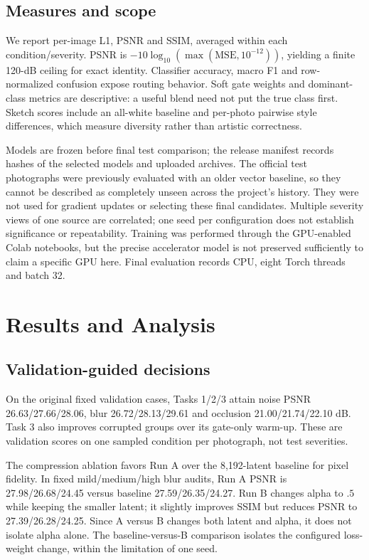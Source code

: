 \documentclass[conference]{IEEEtran}
\begin{document}
\subsection{Measures and scope}
We report per-image L1, PSNR and SSIM, averaged within each condition/severity. PSNR is $-10\log_{10}(\max(\mathrm{MSE},10^{-12}))$, yielding a finite 120-dB ceiling for exact identity. Classifier accuracy, macro F1 and row-normalized confusion expose routing behavior. Soft gate weights and dominant-class metrics are descriptive: a useful blend need not put the true class first. Sketch scores include an all-white baseline and per-photo pairwise style differences, which measure diversity rather than artistic correctness.

Models are frozen before final test comparison; the release manifest records hashes of the selected models and uploaded archives. The official test photographs were previously evaluated with an older vector baseline, so they cannot be described as completely unseen across the project's history. They were not used for gradient updates or selecting these final candidates. Multiple severity views of one source are correlated; one seed per configuration does not establish significance or repeatability. Training was performed through the GPU-enabled Colab notebooks, but the precise accelerator model is not preserved sufficiently to claim a specific GPU here. Final evaluation records CPU, eight Torch threads and batch 32.

\section{Results and Analysis}
\subsection{Validation-guided decisions}
On the original fixed validation cases, Tasks 1/2/3 attain noise PSNR 26.63/27.66/28.06, blur 26.72/28.13/29.61 and occlusion 21.00/21.74/22.10 dB. Task 3 also improves corrupted groups over its gate-only warm-up. These are validation scores on one sampled condition per photograph, not test severities.

The compression ablation favors Run A over the 8,192-latent baseline for pixel fidelity. In fixed mild/medium/high blur audits, Run A PSNR is 27.98/26.68/24.45 versus baseline 27.59/26.35/24.27. Run B changes alpha to $.5$ while keeping the smaller latent; it slightly improves SSIM but reduces PSNR to 27.39/26.28/24.25. Since A versus B changes both latent and alpha, it does not isolate alpha alone. The baseline-versus-B comparison isolates the configured loss-weight change, within the limitation of one seed.
\end{document}
